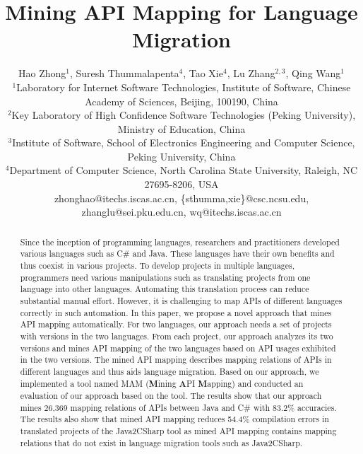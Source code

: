 \documentclass{sig-alternate}
\begin{document}

\title{Mining API Mapping for Language Migration}

\author{
Hao Zhong$^{1}$, Suresh Thummalapenta$^4$, Tao Xie$^4$, Lu Zhang$^{2,3}$, Qing Wang$^{1}$\\
\small{$^1$Laboratory for Internet Software Technologies, Institute of Software, Chinese Academy of Sciences, Beijing, 100190, China}\\
\small{$^2$Key Laboratory of High Confidence Software Technologies (Peking University), Ministry of Education, China}\\
\small{$^3$Institute of Software, School of Electronics Engineering and Computer Science, Peking University, China} \\
\small{$^4$Department of Computer Science, North Carolina State University, Raleigh, NC 27695-8206, USA}\\
\small{zhonghao@itechs.iscas.ac.cn, \{sthumma,xie\}@csc.ncsu.edu,
zhanglu@sei.pku.edu.cn, wq@itechs.iscas.ac.cn}}

\maketitle
\thispagestyle{empty}

\begin{abstract}
Since the inception of programming languages, researchers and
practitioners developed various languages such as C\# and Java. These
languages have their own benefits and thus coexist in various
projects. To develop projects in multiple languages, programmers
need various manipulations such as translating projects from one
language into other languages. Automating this translation process
can reduce substantial manual effort. However, it is  challenging to
map APIs of different languages correctly in such automation. In
this paper, we propose a novel approach that mines API mapping
automatically. For two languages, our approach needs a set of
projects with versions in the two languages. From each project, our
approach analyzes its two versions and mines API mapping of the two
languages based on API usages exhibited in the two versions. The
mined API mapping describes mapping relations of APIs in different
languages and thus aids language migration. Based on our approach,
we implemented a tool named MAM (\textbf{M}ining \textbf{A}PI
\textbf{M}apping) and conducted an evaluation of our approach based
on the tool. The results show that our approach mines 26,369 mapping
relations of APIs between Java and C\# with 83.2\% accuracies. The
results also show that mined API mapping reduces 54.4\% compilation
errors in translated projects of the Java2CSharp tool as mined API
mapping contains mapping relations that do not exist in language
migration tools such as Java2CSharp.
\end{abstract}
\end{document}
